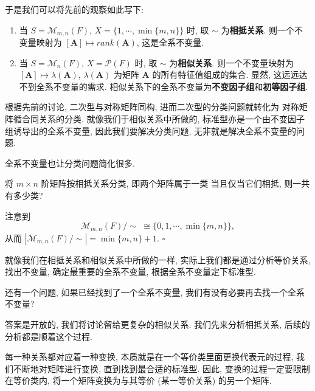 \documentclass[UTF8]{book}
\newenvironment{solution}{{\noindent\it Solution.} }{\hfill $\square$\par}
\begin{document}
\begin{example}
    于是我们可以将先前的观察如此写下: 
    \begin{enumerate}[(1)]
        \item 当 $ S = \mathcal{M}_{m,n}(F)$, $X=\{1,\cdots,\min\{m,n\}\}$ 
        时, 取 $\sim$ 为\textbf{相抵关系}. 
        则一个不变量映射为 $ [\boldsymbol{A}] \mapsto rank(\boldsymbol{A}) $, 
        这是全系不变量. 

        \item 当 $ S = \mathcal{M}_{n}(F)$, 
        $X = \mathcal{P}(F)$ 时, 取 $\sim$ 为\textbf{相似关系}.
        则一个不变量映射为 $ [\boldsymbol{A}] \mapsto \lambda(\boldsymbol{A}) $, 
        $\lambda(\boldsymbol{A})$ 为矩阵 $\boldsymbol{A}$ 
        的所有特征值组成的集合. 显然, 这远远达不到全系不变量的需求. 
        相似关系下的全系不变量为\textbf{不变因子组}和\textbf{初等因子组}. 
    \end{enumerate}
\end{example}

根据先前的讨论, 二次型与对称矩阵同构, 进而二次型的分类问题就转化为
对称矩阵循合同关系的分类. 
就像我们于相似关系中所做的, 标准型亦是一个由不变因子组诱导出的全系不变量, 
因此我们要解决分类问题, 无非就是解决全系不变量的问题. 

全系不变量也让分类问题简化很多. 

\begin{proposition}
    将 $m \times n$ 阶矩阵按相抵关系分类, 即两个矩阵属于一类
    当且仅当它们相抵, 则一共有多少类? 
\end{proposition}

\begin{solution}
    注意到 
    $$\mathcal{M}_{m,n}(F)/\sim \,\, \cong \{0,1,\cdots,\min\{m,n\}\},$$
    从而 $ |\mathcal{M}_{m,n}(F)/\sim| = \min\{m,n\} +1$.
\end{solution}

就像我们在相抵关系和相似关系中所做的一样, 
实际上我们都是通过分析等价关系, 找出不变量, 确定最重要的全系不变量, 
根据全系不变量定下标准型. 

还有一个问题, 如果已经找到了一个全系不变量, 我们有没有必要再去找一个全系不变量? 

答案是开放的, 我们将讨论留给更复杂的相似关系. 
我们先来分析相抵关系, 后续的分析都是顺着这个过程. 

每一种关系都对应着一种变换, 本质就是在一个等价类里面更换代表元的过程, 
我们不断地对矩阵进行变换, 直到找到最合适的标准型. 
因此, 变换的过程一定要限制在等价类内, 将一个矩阵变换为与其等价 (某一等价关系) 
的另一个矩阵. 
\end{document}
